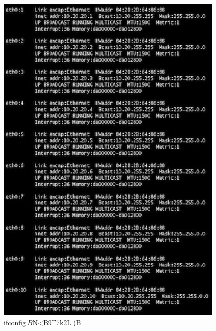 \begin{figure}
  \includegraphics[width=15cm]{img/ipaliasing.eps}
  \caption{ifconfig$B$N<B9T7k2L(B}
  \label{fig:javassist}
\end{figure}


